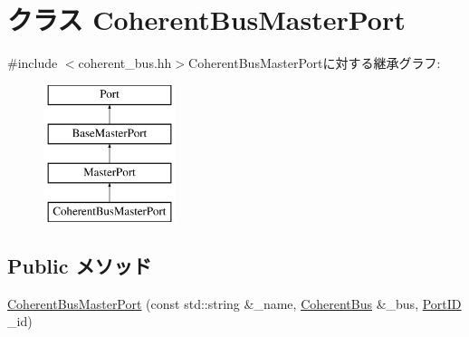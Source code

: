 \hypertarget{classCoherentBus_1_1CoherentBusMasterPort}{
\section{クラス CoherentBusMasterPort}
\label{classCoherentBus_1_1CoherentBusMasterPort}
}


{\ttfamily \#include $<$coherent\_\-bus.hh$>$}CoherentBusMasterPortに対する継承グラフ:\begin{figure}[H]
\begin{center}
\leavevmode
\includegraphics[height=4cm]{classCoherentBus_1_1CoherentBusMasterPort}
\end{center}
\end{figure}
\subsection*{Public メソッド}
\begin{DoxyCompactItemize}
\item 
\hyperlink{classCoherentBus_1_1CoherentBusMasterPort_adb2bec6a04a297da2caffbe21d6c8fc0}{CoherentBusMasterPort} (const std::string \&\_\-name, \hyperlink{classCoherentBus}{CoherentBus} \&\_\-bus, \hyperlink{base_2types_8hh_acef4d7d41cb21fdc252e20c04cd7bb8e}{PortID} \_\-id)
\end{DoxyCompactItemize}
